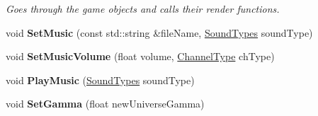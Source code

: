 \begin{DoxyCompactItemize}
\begin{DoxyCompactList}\small\item\em Goes through the game objects and calls their render functions. \end{DoxyCompactList}\item 
\hypertarget{class_universe_aecd0ba77180dcc045a2d31e7ef64b3e9}{void {\bfseries Set\-Music} (const std\-::string \&file\-Name, \hyperlink{_audio_8h_ad6c201b2d4894f8a7b43d7a07bbac991}{Sound\-Types} sound\-Type)}\label{class_universe_aecd0ba77180dcc045a2d31e7ef64b3e9}

\item 
\hypertarget{class_universe_a4152ffb33daa42b2c188ed7347f809e6}{void {\bfseries Set\-Music\-Volume} (float volume, \hyperlink{_audio_8h_a19a96edeeb9d37072c4ce9f862d19ba8}{Channel\-Type} ch\-Type)}\label{class_universe_a4152ffb33daa42b2c188ed7347f809e6}

\item 
\hypertarget{class_universe_a8b39d002becbb8b6d7843472cba841ac}{void {\bfseries Play\-Music} (\hyperlink{_audio_8h_ad6c201b2d4894f8a7b43d7a07bbac991}{Sound\-Types} sound\-Type)}\label{class_universe_a8b39d002becbb8b6d7843472cba841ac}

\item 
\hypertarget{class_universe_affb04bbd6a13f1cd376d5a1761b07a44}{void {\bfseries Set\-Gamma} (float new\-Universe\-Gamma)}\label{class_universe_affb04bbd6a13f1cd376d5a1761b07a44}

\end{DoxyCompactItemize}
